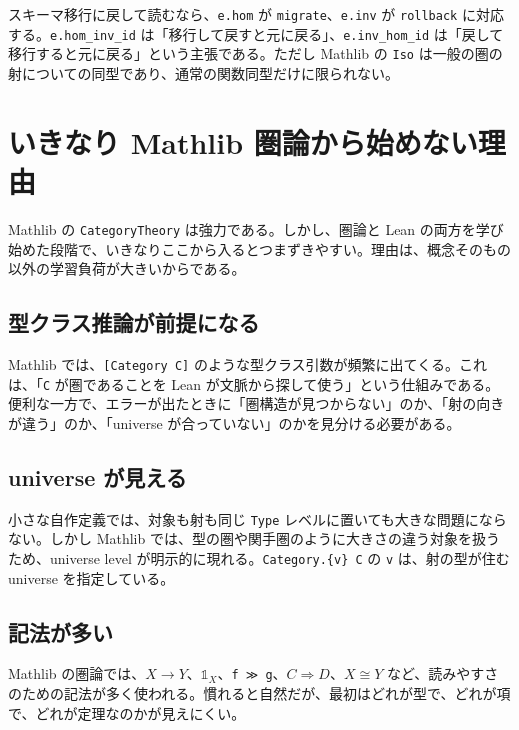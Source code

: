 \begin{softwarebox}
スキーマ移行に戻して読むなら、\texttt{e.hom} が \texttt{migrate}、\texttt{e.inv} が \texttt{rollback} に対応する。\texttt{e.hom\_inv\_id} は「移行して戻すと元に戻る」、\texttt{e.inv\_hom\_id} は「戻して移行すると元に戻る」という主張である。ただし Mathlib の \texttt{Iso} は一般の圏の射についての同型であり、通常の関数同型だけに限られない。
\end{softwarebox}

\section{いきなり Mathlib 圏論から始めない理由}

Mathlib の \texttt{CategoryTheory} は強力である。しかし、圏論と Lean の両方を学び始めた段階で、いきなりここから入るとつまずきやすい。理由は、概念そのもの以外の学習負荷が大きいからである。

\subsection{型クラス推論が前提になる}

Mathlib では、\texttt{[Category C]} のような型クラス引数が頻繁に出てくる。これは、「\texttt{C} が圏であることを Lean が文脈から探して使う」という仕組みである。便利な一方で、エラーが出たときに「圏構造が見つからない」のか、「射の向きが違う」のか、「universe が合っていない」のかを見分ける必要がある。

\subsection{universe が見える}

小さな自作定義では、対象も射も同じ \texttt{Type} レベルに置いても大きな問題にならない。しかし Mathlib では、型の圏や関手圏のように大きさの違う対象を扱うため、universe level が明示的に現れる。\texttt{Category.\{v\} C} の \texttt{v} は、射の型が住む universe を指定している。

\subsection{記法が多い}

Mathlib の圏論では、\(X \longrightarrow Y\)、\(\mathbb{1}_X\)、\texttt{f ≫ g}、\(C \Rightarrow D\)、\(X \cong Y\) など、読みやすさのための記法が多く使われる。慣れると自然だが、最初はどれが型で、どれが項で、どれが定理なのかが見えにくい。

